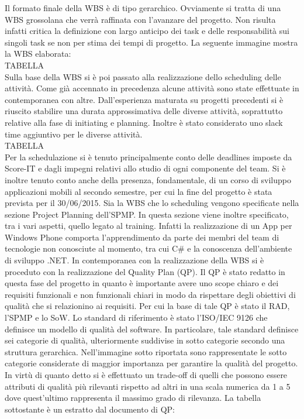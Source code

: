 Il formato finale della WBS è di tipo gerarchico. Ovviamente si tratta di una WBS grossolana che verrà raffinata con l’avanzare del progetto. Non risulta infatti critica la definizione con largo anticipo dei task e delle responsabilità sui singoli task se non per stima dei tempi di progetto.
La seguente immagine mostra la WBS elaborata:
\\
TABELLA
\\
Sulla base della WBS si è poi passato alla realizzazione dello scheduling delle attività.
Come già accennato in precedenza alcune attività sono state effettuate in contemporanea con altre. Dall’esperienza maturata su progetti precedenti si è riuscito stabilire una durata approssimativa delle diverse attività, soprattutto relative alla fase di initiating e planning.
Inoltre è stato considerato uno slack time aggiuntivo per le diverse attività.
\\
TABELLA
\\
Per la schedulazione si è tenuto principalmente conto delle deadlines imposte da Score-IT e dagli impegni relativi allo studio di ogni componente del team.
Si è inoltre tenuto conto anche della presenza, fondamentale, di un corso di sviluppo applicazioni mobili al secondo semestre, per cui la fine del progetto è stata prevista per il 30/06/2015.
Sia la WBS che lo scheduling vengono specificate nella sezione Project Planning dell’SPMP. In questa sezione viene inoltre specificato, tra i vari aspetti, quello legato al training.
Infatti la realizzazione di un App per Windows Phone comporta 
l\rq apprendimento da parte dei membri del team di tecnologie non conosciute al momento, tra cui C\# e la conoscenza dell’ambiente di sviluppo .NET.
In contemporanea con la realizzazione della WBS si è proceduto con la realizzazione del Quality Plan (QP). 
Il QP è stato redatto in questa fase del progetto in quanto è importante avere uno scope chiaro e dei requisiti funzionali e non funzionali chiari in modo da rispettare degli obiettivi di qualità che si relazionino ai requisiti.
Per cui la base di tale QP è stato il RAD, l’SPMP e lo SoW.
Lo standard di riferimento è stato l’ISO/IEC 9126 che definisce un modello di qualità del software. In particolare, tale standard definisce sei categorie di qualità, ulteriormente suddivise in sotto categorie secondo una struttura gerarchica.
Nell’immagine sotto riportata sono rappresentate le sotto categorie considerate di maggior importanza per garantire la qualità del progetto.
In virtù di quanto detto si è effettuato un trade-off di quelli che possono essere attributi di qualità più rilevanti rispetto ad altri in una scala numerica da 1 a 5 dove quest’ultimo rappresenta il massimo grado di rilevanza. La tabella sottostante è un estratto dal documento di QP:

